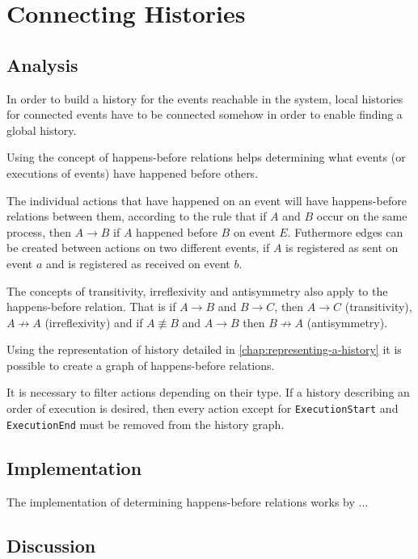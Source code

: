 \chapter{Connecting Histories} %
	\section{Analysis} %
	In order to build a history for the events reachable in the system, local histories for connected events have to be connected somehow in order to enable finding a global history. 
	
	Using the concept of happens-before relations helps determining what events (or executions of events) have happened before others. 
	
	The individual actions that have happened on an event will have happens-before relations between them, according to the rule that if $A$ and $B$ occur on the same process, then $A \rightarrow B$ if $A$ happened before $B$ on event $E$. 
	Futhermore edges can be created between actions on two different events, if $A$ is registered as sent on event $a$ and is registered as received on event $b$.
	
	The concepts of transitivity, irreflexivity and antisymmetry also apply to the happens-before relation. That is if $A \rightarrow B$ and $B \rightarrow C$, then $A \rightarrow C$ (transitivity), $A \not\rightarrow A$ (irreflexivity) and if $A \not\equiv B$ and $A \rightarrow B$ then $B \not\rightarrow A$ (antisymmetry).
	
	Using the representation of history detailed in \ref{chap:representing-a-history} it is possible to create a graph of happens-before relations.
	
	
	It is necessary to filter actions depending on their type. If a history describing an order of execution is desired, then every action except for \texttt{ExecutionStart} and \texttt{ExecutionEnd} must be removed from the history graph. 
	
	\section{Implementation} %
	The implementation of determining happens-before relations works by ...
	
	\section{Discussion} %
	